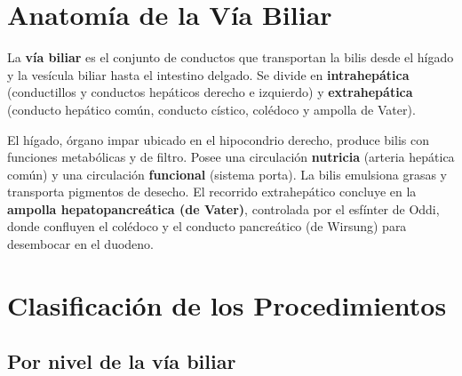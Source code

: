 \section*{Anatomía de la Vía Biliar}

\begin{cajadefinicion}
	La \textbf{vía biliar} es el conjunto de conductos que transportan la bilis desde el hígado y la vesícula biliar hasta el intestino delgado. Se divide en \textbf{intrahepática} (conductillos y conductos hepáticos derecho e izquierdo) y \textbf{extrahepática} (conducto hepático común, conducto cístico, colédoco y ampolla de Vater).
\end{cajadefinicion}

El hígado, órgano impar ubicado en el hipocondrio derecho, produce bilis con funciones metabólicas y de filtro. Posee una circulación \textbf{nutricia} (arteria hepática común) y una circulación \textbf{funcional} (sistema porta). La bilis emulsiona grasas y transporta pigmentos de desecho. El recorrido extrahepático concluye en la \textbf{ampolla hepatopancreática (de Vater)}, controlada por el esfínter de Oddi, donde confluyen el colédoco y el conducto pancreático (de Wirsung) para desembocar en el duodeno.

\section*{Clasificación de los Procedimientos}

\subsection*{Por nivel de la vía biliar}

